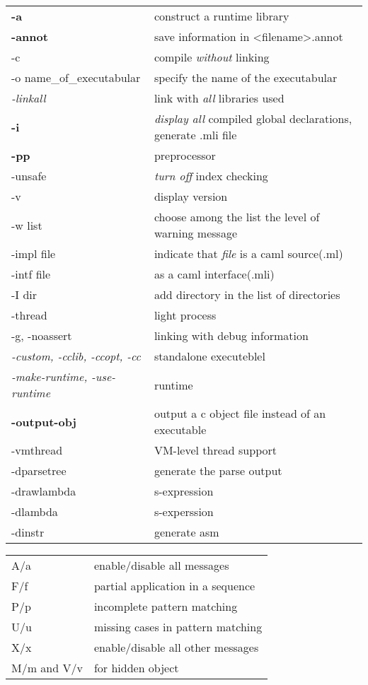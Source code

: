   



  \begin{tabular}{|l|l|}
    \hline
    \textbf{-a} & construct a runtime library \\
    \textbf{-annot} & save information in <filename>.annot \\
    -c & compile \textit{without} linking \\
    -o name\_of\_executabular & specify the name of the executabular \\
    \emph{-linkall} & link with \textit{all} libraries used \\
    \textbf{-i} & \textit{display all } compiled global declarations, generate
    .mli file \\
    \textbf{-pp} & preprocessor \\
    -unsafe & \textit{turn off} index checking \\
    -v & display version \\
    -w list & choose among the list the level of warning message \\
    -impl file & indicate that \textit{file} is a caml source(.ml) \\
    -intf file & as a caml interface(.mli) \\
    -I dir & add directory in the list of directories \\
    \hline
    -thread & light process \\
    -g, -noassert & linking  with debug information\\
    \textit{-custom, -cclib, -ccopt, -cc} & standalone executeblel \\
    \textit{-make-runtime, -use-runtime} & runtime \\
    \textbf{-output-obj} & output a c object file instead of an
    executable \\
    \hline
    -vmthread & VM-level thread support\\
    \hline
    -dparsetree & generate the parse output\\
    -drawlambda & s-expression\\
    -dlambda & s-experssion \\
    -dinstr & generate asm \\
    \hline
\end{tabular}


\begin{tabular}{|l|l|}
    \hline
  A/a & enable/disable all messages \\
  F/f & partial application in a sequence \\
  P/p & incomplete pattern matching \\
  U/u & missing cases in pattern matching \\
  X/x & enable/disable all other messages \\
  M/m and V/v & for hidden object \\
  \hline
\end{tabular}

